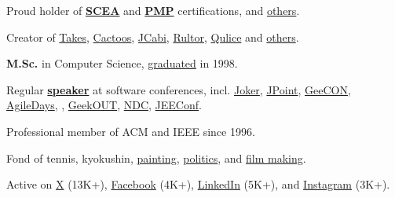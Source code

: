 \documentclass{yb}
\begin{document}
Proud holder of \textbf{\href{https://github.com/yegor256/blog/blob/master/pdf/certifications/OCMJEA-Feb11.pdf}{SCEA}} and
  \textbf{\href{https://github.com/yegor256/blog/blob/master/pdf/certifications/PMP-Jun07.pdf}{PMP}} certifications,
  and \href{https://github.com/yegor256/blog/tree/master/pdf/certifications}{others}.

Creator of \href{https://www.takes.org}{Takes},
  \href{https://www.cactoos.org}{Cactoos},
  \href{https://www.jcabi.com}{JCabi},
  \href{https://www.rultor.com}{Rultor},
  \href{https://www.qulice.com}{Qulice} and
  \href{https://www.yegor256.com/pets.html}{others}.

\textbf{M.Sc.} in Computer Science,
  \href{https://en.wikipedia.org/wiki/Oles_Honchar_Dnipro_National_University}{graduated} in 1998.

Regular \textbf{\href{https://www.yegor256.com/talks.html}{speaker}}
  at software conferences, incl.
  \href{https://youtu.be/55mwAbuDrV8}{Joker},
  \href{https://www.youtube.com/watch?v=20QBvrHq6TA}{JPoint},
  \href{https://vimeo.com/177215750}{GeeCON},
  \href{https://www.youtube.com/watch?v=TLM9eN0b6zo}{AgileDays},
  \href{https://www.youtube.com/watch?v=03PXmPc7Q3g}{},
  \href{https://www.youtube.com/watch?v=7yTIWFZrXpg}{GeekOUT},
  \href{https://www.youtube.com/watch?v=vU_x6oK437I}{NDC},
  \href{https://www.youtube.com/watch?v=GS45LzE3LPQ}{JEEConf}.

Professional member of ACM and IEEE since 1996.

Fond of
  tennis,
  kyokushin,
  \href{https://www.yegor256.com/paintings.html}{painting},
  \href{https://ru.yegor256.com}{politics},
  and
  \href{https://www.imdb.com/name/nm15660607}{film making}.

Active on
  \href{https://twitter.com/intent/follow?screen_name=yegor256}{X} (13K+),
  \href{https://www.facebook.com/yegor256}{Facebook} (4K+),
  \href{https://www.linkedin.com/in/yegor256}{LinkedIn} (5K+),
  and
  \href{https://instagram.com/yegor256}{Instagram} (3K+).
\end{document}

